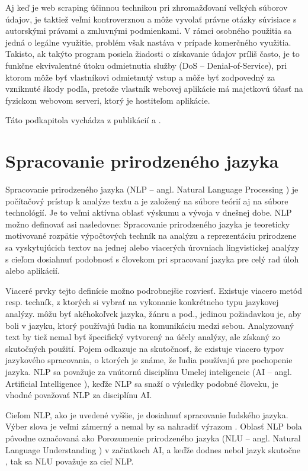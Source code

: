 Aj keď je web scraping účinnou technikou pri zhromažďovaní veľkých súborov údajov, je taktiež veľmi kontroverznou a môže vyvolať právne otázky súvisiace s autorskými právami a zmluvnými podmienkami. V rámci osobného použitia sa jedná o legálne využitie,  problém však nastáva v prípade komerčného využitia. Takisto, ak takýto program posiela žiadosti o získavanie údajov príliš často, je to funkčne ekvivalentné útoku odmietnutia služby (DoS -- Denial-of-Service), pri ktorom môže byť vlastníkovi odmietnutý vstup a môže byť zodpovedný za vzniknuté škody podľa, pretože vlastník webovej aplikácie má majetkovú účasť na fyzickom webovom serveri, ktorý je hostiteľom aplikácie.

Táto podkapitola vychádza z publikácií \cite{Zhao:2017} a \cite{Sirisuriya:2015}.


\section{Spracovanie prirodzeného jazyka}

Spracovanie prirodzeného jazyka (NLP -- angl. Natural Language Processing ) je počítačový prístup k analýze textu a je založený na súbore teórií aj na súbore technológií. Je to veľmi aktívna oblasť výskumu a vývoja v dnešnej dobe. NLP možno definovať asi nasledovne: Spracovanie prirodzeného jazyka je teoreticky motivované rozpätie výpočtových techník na analýzu a reprezentáciu prirodzene sa vyskytujúcich textov na jednej alebo viacerých úrovniach lingvistickej analýzy s cieľom dosiahnuť podobnosť s človekom pri spracovaní jazyka pre celý rad úloh alebo aplikácií.

Viaceré prvky tejto definície možno podrobnejšie rozviesť. Existuje viacero metód resp. techník, z ktorých si vybrať na vykonanie konkrétneho typu jazykovej analýzy.  môžu byť akéhokoľvek jazyka, žánru a pod., jedinou požiadavkou je, aby boli v jazyku, ktorý používajú ľudia na komunikáciu medzi sebou. Analyzovaný text by tiež nemal byť špecifický vytvorený na účely analýzy, ale získaný zo skutočných použití. Pojem  odkazuje na skutočnosť, že existuje viacero typov jazykového spracovania, o ktorých je známe, že ľudia používajú pre pochopenie jazyka. NLP sa považuje za vnútornú disciplínu Umelej inteligencie (AI -- angl. Artificial Intelligence ), keďže NLP sa snaží o výsledky podobné človeku, je vhodné považovať NLP za disciplínu AI.

Cieľom NLP, ako je uvedené vyššie, je dosiahnuť spracovanie ľudského jazyka. Výber slova  je veľmi zámerný a nemal by sa nahradiť výrazom . Oblasť NLP bola pôvodne označovaná ako Porozumenie prirodzeného jazyka (NLU -- angl. Natural Language Understanding ) v začiatkoch AI, a keďže dodnes nebol jazyk skutočne , tak sa NLU považuje za cieľ NLP. 

